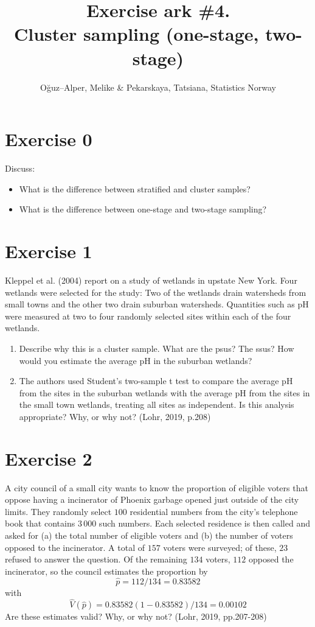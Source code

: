 \documentclass[12pt]{article}
\begin{document}
\title{Exercise ark \#4.\\ Cluster sampling (one-stage, two-stage)}
\author{O\u{g}uz--Alper, Melike \& Pekarskaya, Tatsiana, Statistics Norway}
\maketitle
\section*{Exercise 0}
Discuss:
\begin{itemize}
\item What is the difference between stratified and cluster samples?\\
\item What is the difference between one-stage and two-stage sampling?
\end{itemize}

\section*{Exercise 1}
Kleppel et al. (2004) report on a study of wetlands in upstate New York. Four wetlands
were selected for the study: Two of the wetlands drain watersheds from small towns
and the other two drain suburban watersheds. Quantities such as pH were measured
at two to four randomly selected sites within each of the four wetlands. 
\begin{enumerate}
\item Describe why this is a cluster sample. What are the psus? The ssus? How would you estimate the average pH in the suburban wetlands?
\item The authors used Student’s two-sample t test to compare the average pH from the sites in the suburban wetlands with the average pH from the sites in the small town wetlands, treating all sites as independent. Is this analysis appropriate? Why, or why not? \hfill (Lohr, 2019, p.208)
\end{enumerate}

\section*{Exercise 2}
 A city council of a small city wants to know the proportion of eligible voters that
oppose having a incinerator of Phoenix garbage opened just outside of the city limits.
They randomly select $100$ residential numbers from the city’s telephone book that contains $3\,000$ such numbers. Each selected residence is then called and asked for (a) the total number of eligible voters and (b) the number of voters opposed to the incinerator. A total of $157$ voters were surveyed; of these, $23$ refused to answer the question. Of the remaining $134$ voters, $112$ opposed the incinerator, so the council estimates the proportion by
$$\hat{p}=112/134=0.83582$$
with 
$$\hat{V}(\hat{p})=0.83582(1-0.83582)/134=0.00102$$
Are these estimates valid? Why, or why not? \hfill(Lohr, 2019, pp.207-208)
\end{document}
